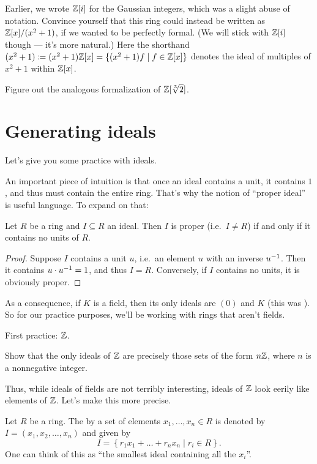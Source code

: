 \begin{exercise}
	Earlier, we wrote $\mathbb Z[i]$ for the Gaussian integers,
	which was a slight abuse of notation.
	Convince yourself that this ring could instead be written as $\mathbb Z[x] / (x^2+1)$,
	if we wanted to be perfectly formal.
	(We will stick with $\mathbb Z[i]$ though --- it's more natural.)
	Here the shorthand $(x^2+1) \coloneqq (x^2+1) \mathbb Z[x] = \{ (x^2+1) f \mid f \in \mathbb Z[x] \}$
	denotes the ideal of multiples of $x^2+1$ within $\mathbb Z[x]$.

	Figure out the analogous formalization of $\mathbb Z[\sqrt[3]{2}]$.
\end{exercise}

\section{Generating ideals}

Let's give you some practice with ideals.

An important piece of intuition is that once an ideal
contains a unit, it contains $1$, and
thus must contain the entire ring.
That's why the notion of ``proper ideal''
is useful language.
To expand on that:
\begin{proposition}
	Let $R$ be a ring and $I \subseteq R$ an ideal.
	Then $I$ is proper (i.e.\ $I \neq R$)
	if and only if it contains no units of $R$.
\end{proposition}
\begin{proof}
	Suppose $I$ contains a unit $u$, i.e.\ an element $u$
	with an inverse $u^{-1}$.
	Then it contains $u \cdot u^{-1} = 1$, and thus $I = R$.
	Conversely, if $I$ contains no units, it is obviously proper.
\end{proof}
As a consequence, if $K$ is a field,
then its only ideals are $(0)$ and $K$
(this was ).
So for our practice purposes, we'll be working with rings that aren't fields.

First practice: $\mathbb Z$.
\begin{exercise}
	Show that the only ideals of $\mathbb Z$ are precisely those
	sets of the form $n\mathbb Z$, where $n$ is a nonnegative integer.
\end{exercise}

Thus, while ideals of fields are not terribly interesting,
ideals of $\mathbb Z$ look eerily like elements of $\mathbb Z$.
Let's make this more precise.
\begin{definition}
	Let $R$ be a ring.
	The  by a set of elements $x_1, \dots, x_n \in R$
	is denoted by $I = (x_1, x_2, \dots, x_n)$
	and given by
	\[ I = \left\{ r_1 x_1 + \dots + r_n x_n \mid r_i \in R \right\}.  \]
	One can think of this as ``the smallest ideal containing all the $x_i$''.
\end{definition}

